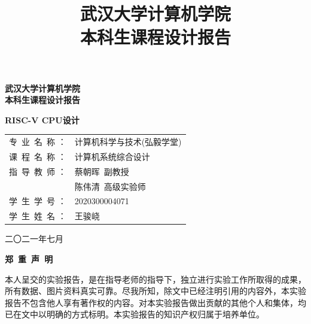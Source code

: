 \documentclass[UTF8,a4paper,autofakebold,15pt]{ctexart}
\title{武汉大学计算机学院\\
	本科生课程设计报告
}
\author{}
\date{}
\newcommand{\song}{\CJKfamily{song}}
\begin{document}
	
	\begin{center}
		
	\vspace{50pt}
	{\song{}\bfseries 武汉大学计算机学院\\\vspace{10pt}
		本科生课程设计报告}
	
	\vspace{50pt}
	
	{\heiti{}\bf RISC-V CPU设计}
	
	\vspace{100pt}
	
	\begin{spacing}{1.5}
	\qquad\begin{tabular}{ll}
		专\ 业\ 名\ 称   ：&计算机科学与技术(弘毅学堂)\\
		
		课\ 程\ 名\ 称   ：&计算机系统综合设计\\
		
		指\ 导\ 教\ 师   ：&蔡朝晖\ 副教授\\
		&陈伟清\ 高级实验师\\
		
		学\ 生\ 学\ 号   ：&2020300004071\\
		
		学\ 生\ 姓\ 名   ：&王骏峣
	\end{tabular}

	\end{spacing}

	\vspace{100pt}

	 二〇二一年七月
	
	\end{center}
	

\newpage

	\begin{center}
	{\setmainfont{SimSun}\bfseries 郑\ 重\ 声\ 明}
	\end{center}

	\vspace{20pt}
	
	本人呈交的实验报告，是在指导老师的指导下，独立进行实验工作所取得的成果，所有数据、图片资料真实可靠。尽我所知，除文中已经注明引用的内容外，本实验报告不包含他人享有著作权的内容。对本实验报告做出贡献的其他个人和集体，均已在文中以明确的方式标明。本实验报告的知识产权归属于培养单位。
	
	\vspace{20pt}
	
\end{document}
